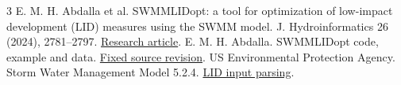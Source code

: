 \documentclass[11pt]{article}
\begin{document}
\begin{thebibliography}{3}\small
{} E. M. H. Abdalla et al. SWMMLIDopt: a tool for optimization of low-impact development (LID) measures using the SWMM model. J. Hydroinformatics 26 (2024), 2781--2797. \href{https://doi.org/10.2166/hydro.2024.123}{Research article}.
 E. M. H. Abdalla. SWMMLIDopt code, example and data. \href{https://github.com/ElhadiMohsenAbdalla/SWMMLIDOPT/tree/a824c03d1864b02d153c81679b61e2d9125d090a}{Fixed source revision}.
 US Environmental Protection Agency. Storm Water Management Model 5.2.4. \href{https://github.com/USEPA/Stormwater-Management-Model/blob/v5.2.4/src/solver/lid.c}{LID input parsing}.
\end{thebibliography}
\end{document}
